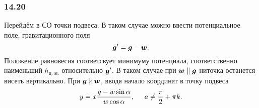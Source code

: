 \subsubsection*{14.20}

Перейдём в СО точки подвеса. В таком случае можно ввести потенциальное поле, гравитационного поля
\begin{equation*}
    \mbox{\boldmath $g$}' = \mbox{\boldmath $g$} - \mbox{\boldmath $w$}.
\end{equation*}
Положение равновесия соответсвует минимуму потенциала, соответственно наименьший $h_{\text{ц. м.}}$ относительно $\mbox{\boldmath $g$}'$. В таком случае при $\mbox{\boldmath $w$} \parallel \mbox{\boldmath $g$}$ ниточка останется висеть вертикально. При $\mbox{\boldmath $g$} \nparallel \mbox{\boldmath $w$}$, вводя начало координат в точку подвеса
\begin{equation}
    y = x \frac{g - w \sin \alpha}{w \cos \alpha}, \hspace{0.5cm} 
    a \neq \frac{\pi}{2} + \pi k.
\end{equation}


